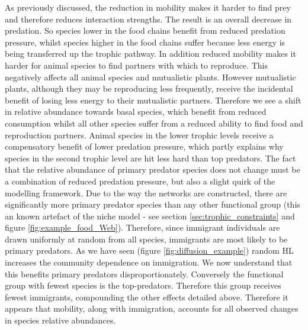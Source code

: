 As previously discussed, the reduction in mobility makes it harder to find prey and therefore reduces interaction strengths. The result is an overall decrease in predation. So species lower in the food chains benefit from reduced predation pressure, whilst species higher in the food chains suffer because less energy is being transferred up the trophic pathway. In addition reduced mobility makes it harder for animal species to find partners with which to reproduce. This negatively affects all animal species and mutualistic plants. However mutualistic plants, although they may be reproducing less frequently, receive the incidental benefit of losing less energy to their mutualistic partners.  Therefore we see a shift in relative abundance towards basal species, which benefit from reduced consumption whilst all other species suffer from a reduced ability to find food and reproduction partners. Animal species in the lower trophic levels receive a compensatory benefit of lower predation pressure, which partly explains why species in the second trophic level are hit less hard than top predators. The fact that the relative abundance of primary predator species does not change must be a combination of reduced predation pressure, but also a slight quirk of the modelling framework. Due to the way the networks are constructed, there are significantly more primary predator species than any other functional group (this an known artefact of the niche model - see section \ref{sec:trophic_constraints} and figure \ref{fig:example_food_Web}). Therefore, since immigrant individuals are drawn uniformly at random from all species, immigrants are most likely to be primary predators. As we have seen (figure \ref{fig:diffusion_example}) random HL increases the community dependence on immigration. We now understand that this benefits primary predators disproportionately. Conversely the functional group with fewest species is the top-predators. Therefore this group receives fewest immigrants, compounding the other effects detailed above. Therefore it appears that mobility, along with immigration, accounts for all observed changes in species relative abundances.  



